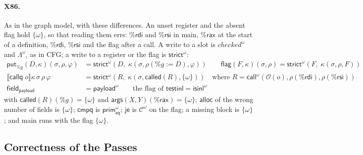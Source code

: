 \documentclass[10pt]{article}
\theoremstyle{acmplain}
\newcommand{\SEM}[1]{\llbracket #1 \rrbracket}
\newcommand{\key}[1]{\mathsf{#1}}
\newcommand{\ext}[3]{#1(#2{:=}#3)}
\newcommand{\rax}{\%\key{rax}}
\newcommand{\rdi}{\%\key{rdi}}
\newcommand{\rsi}{\%\key{rsi}}
\begin{document}
\paragraph{X86.} As in the graph model, with these differences. An unset
register and the absent flag hold $\{\omega\}$, so that reading them
errs: $\rdi$ and $\rsi$ in main, $\rax$ at the start of a definition,
$\rdi$, $\rsi$ and the flag after a call. A write to a slot is
$\mathit{checked}^{\omega}$ and $\Lambda^{\omega}$, as in CFG; a write to a
register or the flag is $\key{strict}^{\omega}$:
\begin{align*}
  \key{put}_{\%g}(D, \kappa)(\sigma, \rho, \varphi) &= \key{strict}^{\omega}(D,\; \kappa(\sigma, \ext{\rho}{\%g}{D}, \varphi)) \qquad
  \key{flag}(F, \kappa)(\sigma, \rho) = \key{strict}^{\omega}(F,\; \kappa(\sigma, \rho, F)) \\
  \SEM{\key{callq}\; o}\kappa\,\sigma\,\rho\,\varphi &= \key{strict}^{\omega}(R,\; \kappa(\sigma, \key{called}(R), \{\omega\}))
    \quad\text{where } R = \key{call}^{\omega}(\mathcal{O}(o), \rho(\rdi), \rho(\rsi)) \\
  \key{field}_{\key{payload}} &= \key{payload}^{\omega} \qquad \text{the flag of } \key{testinl} = \key{isinl}^{\omega}
\end{align*}
with $\key{called}(R)(\%g) = \{\omega\}$ and $\key{args}(X, Y)(\rax) =
\{\omega\}$; $\key{alloc}$ of the wrong number of fields is $\{\omega\}$;
$\key{cmpq}$ is $\key{prim}^{\omega}_{\key{eq}}$; $\key{je}$ is
$\mathcal{C}^{\omega}$ on the flag; a missing block is $\{\omega\}$; and
main runs with the flag $\{\omega\}$.

\subsection{Correctness of the Passes}
\end{document}

